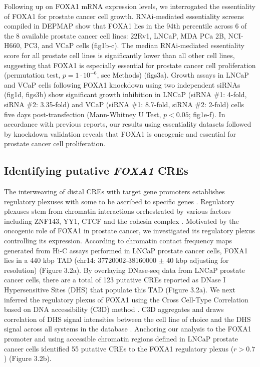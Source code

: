 Following up on FOXA1 mRNA expression levels, we interrogated the essentiality of FOXA1 for prostate cancer cell growth.
RNAi-mediated essentiality screens compiled in DEPMAP show that FOXA1 lies in the 94th percentile across 6 of the 8 available prostate cancer cell lines: 22Rv1, LNCaP, MDA PCa 2B, NCI-H660, PC3, and VCaP cells (fig1b-c).
The median RNAi-mediated essentiality score for all prostate cell lines is significantly lower than all other cell lines, suggesting that FOXA1 is especially essential for prostate cancer cell proliferation (permutation test, $p = 1 \cdot 10^{-6}$, see Methods) (figs3a).
Growth assays in LNCaP and VCaP cells following FOXA1 knockdown using two independent siRNAs (fig1d, figs3b) show significant growth inhibition in LNCaP (siRNA \#1: 4-fold, siRNA \#2: 3.35-fold) and VCaP (siRNA \#1: 8.7-fold, siRNA \#2: 2-fold) cells five days post-transfection (Mann-Whitney U Test, $p<0.05$; fig1e-f).
In accordance with previous reports, our results using essentiality datasets followed by knockdown validation reveals that FOXA1 is oncogenic and essential for prostate cancer cell proliferation.

\subsection{Identifying putative \emph{FOXA1} CREs}

The interweaving of distal CREs with target gene promoters establishes regulatory plexuses with some to be ascribed to specific genes \cite{sallariConvergenceDispersedRegulatory2016,baileyNoncodingSomaticInherited2016}.
Regulatory plexuses stem from chromatin interactions orchestrated by various factors including ZNF143, YY1, CTCF and the cohesin complex \cite{phillipsCTCFMasterWeaver2009,weintraubYY1StructuralRegulator2017,baileyZNF143ProvidesSequence2015}.
Motivated by the oncogenic role of FOXA1 in prostate cancer, we investigated its regulatory plexus controlling its expression.
According to chromatin contact frequency maps generated from Hi-C assays performed in LNCaP prostate cancer cells, FOXA1 lies in a 440 kbp TAD (chr14: 37720002-38160000 $\pm$ 40 kbp adjusting for resolution) (Figure 3.2a).
By overlaying DNase-seq data from LNCaP prostate cancer cells, there are a total of 123 putative CREs reported as DNase I Hypersensitive Sites (DHS) that populate this TAD (Figure 3.2a).
We next inferred the regulatory plexus of FOXA1 using the Cross Cell-Type Correlation based on DNA accessibility (C3D) method \cite{mehdiC3DToolPredict2019}.
C3D aggregates and draws correlation of DHS signal intensities between the cell line of choice and the DHS signal across all systems in the database \cite{mehdiC3DToolPredict2019}.
Anchoring our analysis to the FOXA1 promoter and using accessible chromatin regions defined in LNCaP prostate cancer cells identified 55 putative CREs to the FOXA1 regulatory plexus ($r > 0.7$) (Figure 3.2b).

